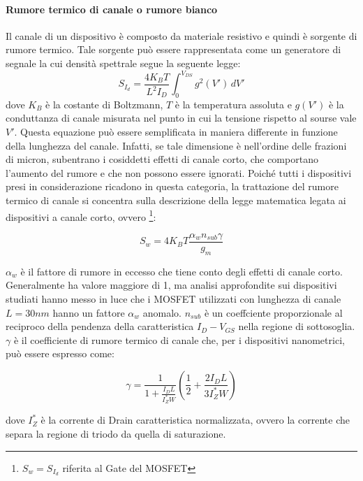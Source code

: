 \paragraph*{Rumore termico di canale o rumore bianco}
Il canale di un dispositivo è composto da materiale resistivo e quindi è sorgente di rumore termico. Tale sorgente può essere rappresentata come un generatore di segnale la cui densità spettrale segue la seguente legge:
\begin{equation}
  S_{I_d} = \frac{4 K_B T}{L^2 I_D} \int_{0}^{V_{DS}} g^2\left(V'\right) \, dV' 
\end{equation}
dove $K_B$ è la costante di Boltzmann, $T$ è la temperatura assoluta e $g\left(V'\right)$ è la conduttanza di canale misurata nel punto in cui la tensione rispetto al sourse vale $V'$. Questa equazione può essere semplificata in maniera differente in funzione della lunghezza del canale.  Infatti, se tale dimensione è nell'ordine delle frazioni di micron, subentrano i cosiddetti effetti di canale corto, che comportano l'aumento del rumore e che non possono essere ignorati.
Poiché tutti i dispositivi presi in considerazione ricadono in questa categoria, la trattazione del rumore termico di canale si concentra sulla descrizione della legge matematica legata ai dispositivi a canale corto, ovvero \footnote{ $ S_w = S_{I_d}$ riferita al Gate del MOSFET}:

\begin{equation}
  S_w = 4 K_B T \frac{\alpha_w n_{sub} \gamma}{g_m}
\end{equation}

$\alpha_w$ è il fattore di rumore in eccesso che tiene conto degli effetti di canale corto. Generalmente ha valore maggiore di 1, ma analisi approfondite sui dispositivi studiati hanno messo in luce che i MOSFET utilizzati con lunghezza di canale $L = 30 nm$ hanno un fattore $\alpha_w$ anomalo. $n_{sub}$ è un coeffciente proporzionale al reciproco della pendenza della caratteristica $I_D-V_{GS}$ nella regione di sottosoglia. $\gamma$ è il coefficiente di rumore termico di canale che, per i dispositivi nanometrici, può essere espresso come:

\begin{equation}
  \gamma = \frac{1}{1 +  \frac {I_D L}{I_Z^* W}}\left(\frac{1}{2} + \frac{ 2 I_D L}{3 I_Z^* W}\right)
\end{equation}

dove $I_Z^*$ è la corrente di Drain caratteristica normalizzata, ovvero la corrente che separa la regione di triodo da quella di saturazione.


